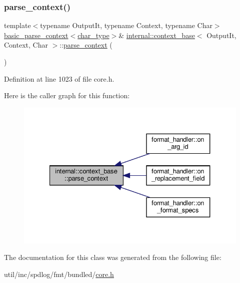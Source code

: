 \subsubsection{\texorpdfstring{parse\+\_\+context()}{parse\_context()}}
{\footnotesize\ttfamily template$<$typename Output\+It, typename Context, typename Char$>$ \\
\hyperlink{classbasic__parse__context}{basic\+\_\+parse\+\_\+context}$<$\hyperlink{classinternal_1_1context__base_a012818dce2cbba8d267491288b9f3f63}{char\+\_\+type}$>$\& \hyperlink{classinternal_1_1context__base}{internal\+::context\+\_\+base}$<$ Output\+It, Context, Char $>$\+::\hyperlink{core_8h_a2707bfb24ad4e3cf64af9a8f9eb733e0}{parse\+\_\+context} (\begin{DoxyParamCaption}{ }\end{DoxyParamCaption})\hspace{0.3cm}{\ttfamily [inline]}}



Definition at line 1023 of file core.\+h.

Here is the caller graph for this function\+:
\nopagebreak
\begin{figure}[H]
\begin{center}
\leavevmode
\includegraphics[width=327pt]{classinternal_1_1context__base_a8b2dea2761b5bd19dfe60435a68f80d6_icgraph}
\end{center}
\end{figure}


The documentation for this class was generated from the following file\+:\begin{DoxyCompactItemize}
\item 
util/inc/spdlog/fmt/bundled/\hyperlink{core_8h}{core.\+h}\end{DoxyCompactItemize}
